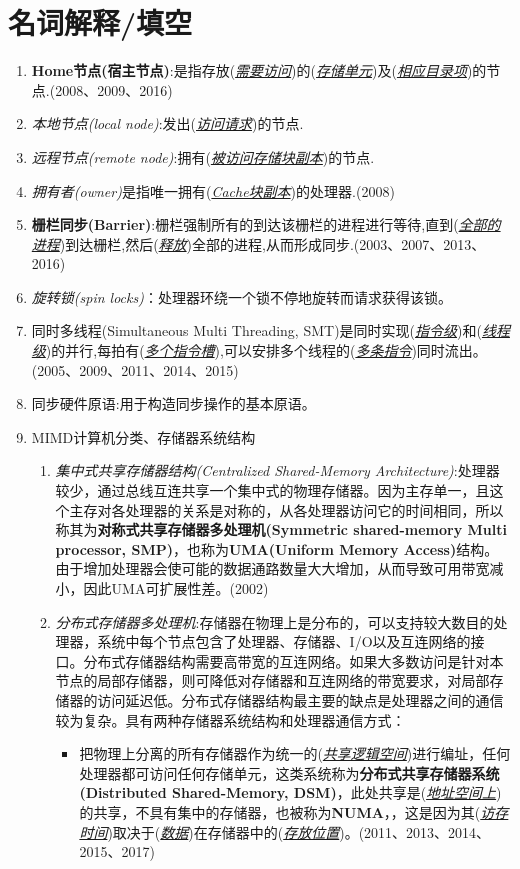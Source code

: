 \documentclass[a4paper]{ctexbook}
\newcommand{\blank}[1]{(\emph{\underline{#1}})}
\begin{document}
\section{名词解释/填空}
\begin{enumerate}
  \item \textbf{Home节点(宿主节点)}:是指存放\blank{需要访问}的\blank{存储单元}及\blank{相应目录项}的节点.(2008、2009、2016)
  \item \emph{本地节点(local node)}:发出\blank{访问请求}的节点.
  \item \emph{远程节点(remote node)}:拥有\blank{被访问存储块副本}的节点.
  \item \emph{拥有者(owner)}是指唯一拥有\blank{Cache块副本}的处理器.(2008)
  \item \textbf{栅栏同步(Barrier)}:栅栏强制所有的到达该栅栏的进程进行等待,直到(\emph{\underline{全部的进程}})到达栅栏,然后(\emph{\underline{释放}})全部的进程,从而形成同步.(2003、2007、2013、2016)
  \item \emph{旋转锁(spin locks)}：处理器环绕一个锁不停地旋转而请求获得该锁。
  \item 同时多线程(Simultaneous Multi Threading, SMT)是同时实现(\emph{\underline{指令级}})和\blank{线程级}的并行,每拍有(\emph{\underline{多个指令槽}}),可以安排多个线程的(\emph{\underline{多条指令}})同时流出。(2005、2009、2011、2014、2015)
  \item 同步硬件原语:用于构造同步操作的基本原语。  
  \item MIMD计算机分类、存储器系统结构
  \begin{enumerate}
    \item \emph{集中式共享存储器结构(Centralized Shared-Memory Architecture)}:处理器较少，通过总线互连共享一个集中式的物理存储器。因为主存单一，且这个主存对各处理器的关系是对称的，从各处理器访问它的时间相同，所以称其为\textbf{对称式共享存储器多处理机(Symmetric shared-memory Multi processor, SMP)}，也称为\textbf{UMA(Uniform Memory Access)}结构。由于增加处理器会使可能的数据通路数量大大增加，从而导致可用带宽减小，因此UMA可扩展性差。(2002)
    \item \emph{分布式存储器多处理机}:存储器在物理上是分布的，可以支持较大数目的处理器，系统中每个节点包含了处理器、存储器、I/O以及互连网络的接口。分布式存储器结构需要高带宽的互连网络。如果大多数访问是针对本节点的局部存储器，则可降低对存储器和互连网络的带宽要求，对局部存储器的访问延迟低。分布式存储器结构最主要的缺点是处理器之间的通信较为复杂。具有两种存储器系统结构和处理器通信方式：
    \begin{itemize}
      \item 把物理上分离的所有存储器作为统一的\blank{共享逻辑空间}进行编址，任何处理器都可访问任何存储单元，这类系统称为\textbf{分布式共享存储器系统(Distributed Shared-Memory, DSM)}，此处共享是\blank{地址空间上}的共享，不具有集中的存储器，也被称为\textbf{NUMA}，，这是因为其\blank{访存时间}取决于\blank{数据}在存储器中的\blank{存放位置}。(2011、2013、2014、2015、2017)

\end{itemize}
\end{enumerate}
\end{enumerate}
\end{document}
